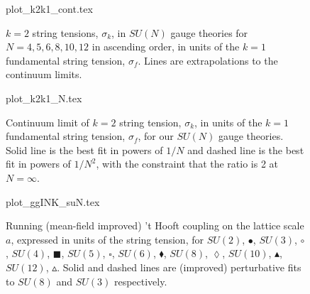 \documentclass[12pt]{article}
\begin{document}






\begin{figure}[htb]
\begin	{center}
\leavevmode
	{plot_k2k1_cont.tex}
\end	{center}
\caption{$k=2$ string tensions, $\sigma_k$, in $SU(N)$ gauge theories
  for $N=4,5,6,8,10,12$ in ascending order, in units of the $k=1$ fundamental string
  tension, $\sigma_f$. Lines are extrapolations to the continuum limits.}
\label{fig_k2k1_cont}
\end{figure}



\begin{figure}[htb]
\begin	{center}
\leavevmode
	{plot_k2k1_N.tex}
\end	{center}
\caption{Continuum limit of $k=2$ string tension, $\sigma_k$, in units of
  the $k=1$ fundamental string tension, $\sigma_f$, for our $SU(N)$ gauge
  theories. Solid line is the best fit in powers of $1/N$ and dashed line
  is the best fit in powers of $1/N^2$, with the constraint that the ratio
  is 2 at $N=\infty$.}
\label{fig_k2k1_N}
\end{figure}




\begin{figure}[htb]
\begin	{center}
\leavevmode
	{plot_ggINK_suN.tex}
\end	{center}
\caption{Running (mean-field improved) 't Hooft coupling on the lattice scale $a$, expressed in
  units of the string tension, for
  $SU(2)$, $\bullet$, $SU(3)$, $\circ$, $SU(4)$, $\blacksquare$,
  $SU(5)$, $\square$, $SU(6)$,  $\blacklozenge$, $SU(8)$, $\lozenge$,
  $SU(10)$, $\blacktriangle$, $SU(12)$, $\vartriangle$.
  Solid and dashed lines are (improved) perturbative fits to $SU(8)$ and $SU(3)$
  respectively.}
\label{fig_ggINK_suN}
\end{figure}
\end{document}
